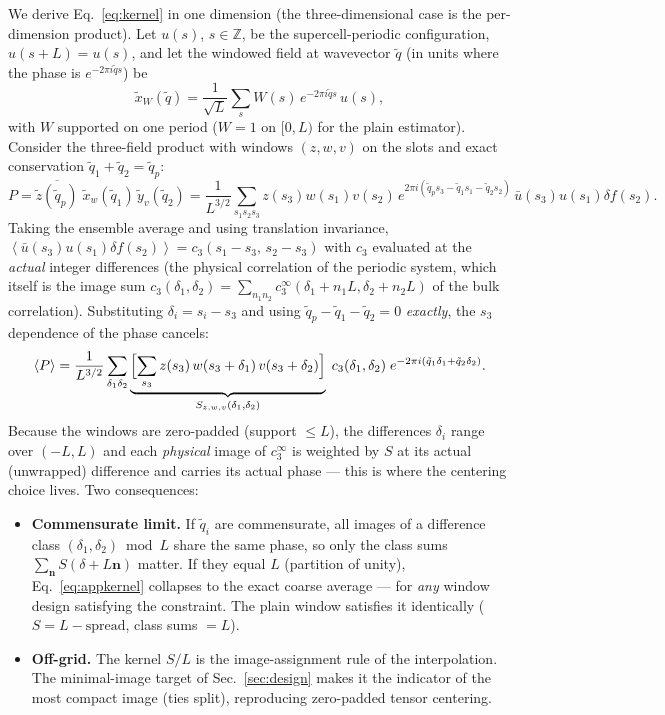 \documentclass[11pt,a4paper]{article}
\newcommand{\avg}[1]{\left\langle #1 \right\rangle}
\begin{document}
We derive Eq.~\eqref{eq:kernel} in one dimension (the three-dimensional
case is the per-dimension product). Let $u(s)$, $s \in \mathbb{Z}$, be the
supercell-periodic configuration, $u(s+L) = u(s)$, and let the windowed
field at wavevector $\tilde q$ (in units where the phase is
$e^{-2\pi i \tilde q s}$) be
\begin{equation}
\tilde x_W(\tilde q) = \frac{1}{\sqrt L} \sum_{s} W(s)\,
e^{-2\pi i \tilde q s}\, u(s),
\end{equation}
with $W$ supported on one period ($W=1$ on $[0,L)$ for the plain
estimator). Consider the three-field product with windows $(z, w, v)$ on
the slots and exact conservation $\tilde q_1 + \tilde q_2 = \tilde q_p$:
\begin{equation}
P = \overline{\tilde z(\tilde q_p)}\; \tilde x_w(\tilde q_1)\,
\tilde y_v(\tilde q_2)
= \frac{1}{L^{3/2}} \sum_{s_1 s_2 s_3} z(s_3) w(s_1) v(s_2)\,
e^{2\pi i (\tilde q_p s_3 - \tilde q_1 s_1 - \tilde q_2 s_2)}\,
\bar u(s_3) u(s_1) \delta\!f(s_2).
\end{equation}
Taking the ensemble average and using translation invariance,
$\avg{\bar u(s_3) u(s_1) \delta\!f(s_2)} = c_3(s_1 - s_3,\, s_2 - s_3)$
with $c_3$ evaluated at the \emph{actual} integer differences (the
physical correlation of the periodic system, which itself is the image
sum $c_3(\delta_1,\delta_2) = \sum_{n_1 n_2}
c_3^{\infty}(\delta_1 + n_1 L, \delta_2 + n_2 L)$ of the bulk
correlation). Substituting $\delta_i = s_i - s_3$ and using
$\tilde q_p - \tilde q_1 - \tilde q_2 = 0$ \emph{exactly}, the $s_3$
dependence of the phase cancels:
\begin{equation}
\avg{P} = \frac{1}{L^{3/2}} \sum_{\delta_1 \delta_2}
\underbrace{\Bigl[\sum_{s_3} z(s_3)\, w(s_3+\delta_1)\, v(s_3+\delta_2)
\Bigr]}_{S_{z,w,v}(\delta_1,\delta_2)}
\; c_3(\delta_1, \delta_2)\;
e^{-2\pi i(\tilde q_1 \delta_1 + \tilde q_2 \delta_2)}.
\label{eq:appkernel}
\end{equation}
Because the windows are zero-padded (support $\le L$), the differences
$\delta_i$ range over $(-L, L)$ and each \emph{physical} image of
$c_3^{\infty}$ is weighted by $S$ at its actual (unwrapped) difference and
carries its actual phase --- this is where the centering choice lives. Two
consequences:
\begin{itemize}
\item \textbf{Commensurate limit.} If $\tilde q_i$ are commensurate, all
images of a difference class $(\delta_1, \delta_2) \bmod L$ share the same
phase, so only the class sums $\sum_{\mathbf n} S(\delta + L\mathbf n)$
matter. If they equal $L$ (partition of unity), Eq.~\eqref{eq:appkernel}
collapses to the exact coarse average --- for \emph{any} window design
satisfying the constraint. The plain window satisfies it identically
($S = L - \mathrm{spread}$, class sums $= L$).
\item \textbf{Off-grid.} The kernel $S/L$ is the image-assignment rule of
the interpolation. The minimal-image target of
Sec.~\ref{sec:design} makes it the indicator of the most compact image
(ties split), reproducing zero-padded tensor centering.
\end{itemize}
\end{document}
